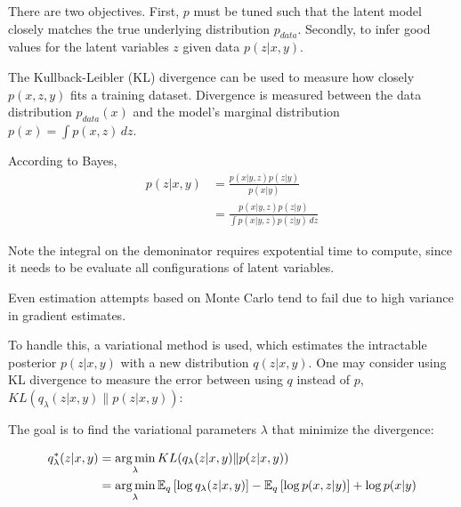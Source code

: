There are two objectives. First, $p$ must be tuned such that the latent model closely matches the true underlying distribution $p_{data}$. Secondly, to infer good values for the latent variables $z$ given data $p(z|x,y)$. 

The Kullback-Leibler (KL) divergence can be used to measure how closely $p(x,z,y)$ fits a training dataset. Divergence is measured between the data distribution $p_{data}(x)$ and the model's marginal distribution $p(x) = \int p(x,z) \,dz$. 


According to Bayes,
$$
\begin{aligned}
  p(z|x,y) 
  &= \frac{p(x|y,z)p(z|y)}{p(x|y)} \\
  &= \frac{p(x|y,z)p(z|y)}{\int p(x|y,z)p(z|y) \,dz}
\end{aligned}
$$

Note the integral on the demoninator requires expotential time to compute, since it needs to be evaluate all configurations of latent variables. 


Even estimation attempts based on Monte Carlo tend to fail due to high variance in gradient estimates.


To handle this, a variational method is used, which estimates the intractable posterior $p(z|x,y)$ with a new distribution $q(z|x,y)$. One may consider using KL divergence to measure the error between using $q$ instead of $p$, $KL(q_{\lambda}(z|x,y) \| p(z|x,y))$:

The goal is to find the variational parameters $\lambda$ that minimize the divergence:

$$
\begin{aligned}
  q^{*}_{\lambda}(z|x,y) 
  &= \operatorname*{arg\,min}_{\lambda} KL(q_{\lambda}(z|x,y) \| p(z|x,y)) \\
  &= \operatorname*{arg\,min}_{\lambda} \mathbb{E}_{q} \left[ \log q_{\lambda}(z|x,y) \right]-\mathbb{E}_{q} \left[ \log p(x,z|y) \right] + \log p(x|y)
\end{aligned}
$$

